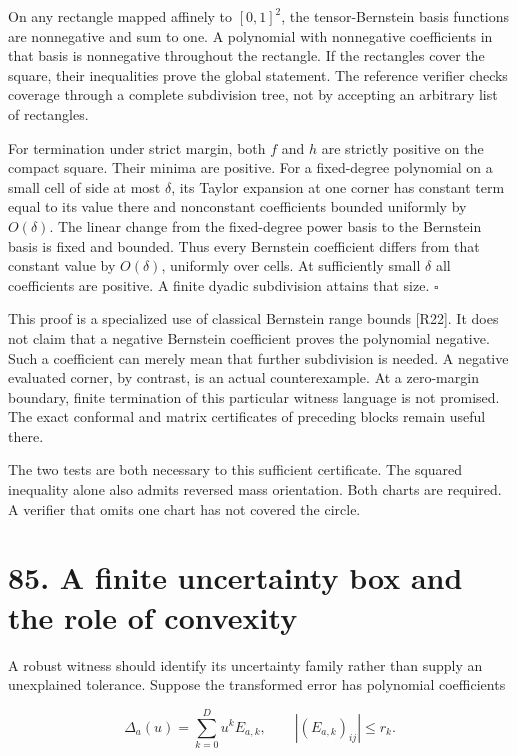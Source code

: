 \documentclass[11pt,letterpaper]{article}
\begin{document}
On any rectangle mapped affinely to \([0,1]^2\), the tensor-Bernstein
basis functions are nonnegative and sum to one. A polynomial with
nonnegative coefficients in that basis is nonnegative throughout the
rectangle. If the rectangles cover the square, their inequalities prove
the global statement. The reference verifier checks coverage through a
complete subdivision tree, not by accepting an arbitrary list of
rectangles.

For termination under strict margin, both \(f\) and \(h\) are strictly
positive on the compact square. Their minima are positive. For a
fixed-degree polynomial on a small cell of side at most \(\delta\), its
Taylor expansion at one corner has constant term equal to its value
there and nonconstant coefficients bounded uniformly by \(O(\delta)\).
The linear change from the fixed-degree power basis to the Bernstein
basis is fixed and bounded. Thus every Bernstein coefficient differs
from that constant value by \(O(\delta)\), uniformly over cells. At
sufficiently small \(\delta\) all coefficients are positive. A finite
dyadic subdivision attains that size. \(\square\)

This proof is a specialized use of classical Bernstein range bounds
{[}R22{]}. It does not claim that a negative Bernstein coefficient
proves the polynomial negative. Such a coefficient can merely mean that
further subdivision is needed. A negative evaluated corner, by contrast,
is an actual counterexample. At a zero-margin boundary, finite
termination of this particular witness language is not promised. The
exact conformal and matrix certificates of preceding blocks remain
useful there.

The two tests are both necessary to this sufficient certificate. The
squared inequality alone also admits reversed mass orientation. Both
charts are required. A verifier that omits one chart has not covered the
circle.

\section{85. A finite uncertainty box and the role of
convexity}\label{a-finite-uncertainty-box-and-the-role-of-convexity}

A robust witness should identify its uncertainty family rather than
supply an unexplained tolerance. Suppose the transformed error has
polynomial coefficients

\[
\Delta_a(u)=\sum_{k=0}^{D}u^kE_{a,k},\qquad
|(E_{a,k})_{ij}|\leq r_k.
\]
\end{document}
